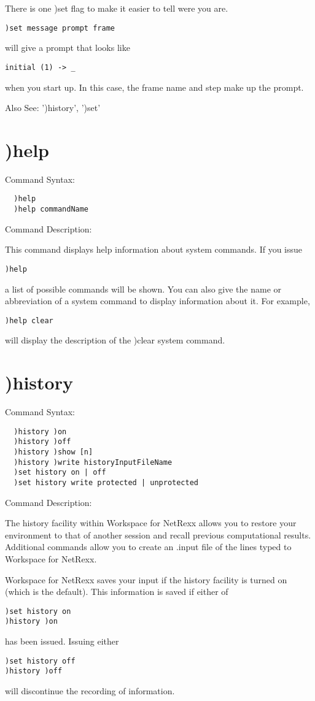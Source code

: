 There is one )set flag to make it easier to tell were you are.
\begin{verbatim}
)set message prompt frame
\end{verbatim}
will give a prompt that looks like
\begin{verbatim}
initial (1) -> _
\end{verbatim}
when you start up. In this case, the frame name and step make up the prompt.

Also See: ')history', ')set'

\section{)help}

Command Syntax:
\begin{verbatim}
  )help
  )help commandName
\end{verbatim}
Command Description:

This command displays help information about system commands. If you issue
\begin{verbatim}
)help
\end{verbatim}
a list of possible commands will be shown. You can also give the name or abbreviation of a system command to display information about it. For example,
\begin{verbatim}
)help clear
\end{verbatim}
will display the description of the )clear system command.

\section{)history}

Command Syntax:
\begin{verbatim}
  )history )on
  )history )off
  )history )show [n]
  )history )write historyInputFileName
  )set history on | off
  )set history write protected | unprotected
\end{verbatim}
Command Description:

The history facility within Workspace for NetRexx allows you to restore your environment to that of another session and recall previous computational results. Additional commands allow you to create an .input file of the lines typed to Workspace for NetRexx.

Workspace for NetRexx saves your input if the history facility is turned on (which is the default). This information is saved if either of
\begin{verbatim}
)set history on
)history )on
\end{verbatim}
has been issued. Issuing either
\begin{verbatim}
)set history off
)history )off
\end{verbatim}
will discontinue the recording of information.


